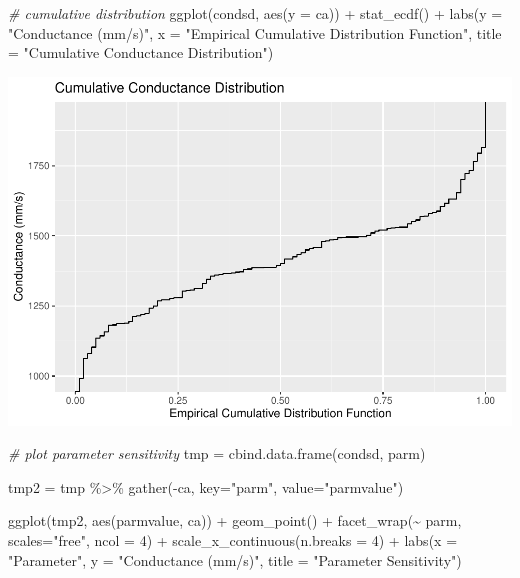 \documentclass[
]{article}
\newenvironment{Shaded}{\begin{snugshade}}{\end{snugshade}}
\newcommand{\AttributeTok}[1]{\textcolor[rgb]{0.77,0.63,0.00}{#1}}
\newcommand{\CommentTok}[1]{\textcolor[rgb]{0.56,0.35,0.01}{\textit{#1}}}
\newcommand{\DecValTok}[1]{\textcolor[rgb]{0.00,0.00,0.81}{#1}}
\newcommand{\FunctionTok}[1]{\textcolor[rgb]{0.00,0.00,0.00}{#1}}
\newcommand{\NormalTok}[1]{#1}
\newcommand{\OtherTok}[1]{\textcolor[rgb]{0.56,0.35,0.01}{#1}}
\newcommand{\SpecialCharTok}[1]{\textcolor[rgb]{0.00,0.00,0.00}{#1}}
\newcommand{\StringTok}[1]{\textcolor[rgb]{0.31,0.60,0.02}{#1}}
\begin{document}
\begin{Shaded}
\begin{Highlighting}[]
\CommentTok{\# cumulative distribution}
\FunctionTok{ggplot}\NormalTok{(condsd, }\FunctionTok{aes}\NormalTok{(}\AttributeTok{y =}\NormalTok{ ca)) }\SpecialCharTok{+}
  \FunctionTok{stat\_ecdf}\NormalTok{() }\SpecialCharTok{+}
  \FunctionTok{labs}\NormalTok{(}\AttributeTok{y =} \StringTok{"Conductance (mm/s)"}\NormalTok{,}
       \AttributeTok{x =} \StringTok{"Empirical Cumulative Distribution Function"}\NormalTok{,}
       \AttributeTok{title =} \StringTok{"Cumulative Conductance Distribution"}\NormalTok{)}
\end{Highlighting}
\end{Shaded}

\includegraphics{assignment_4_files/figure-latex/unnamed-chunk-4-2.pdf}

\begin{Shaded}
\begin{Highlighting}[]
\CommentTok{\# plot parameter sensitivity}
\NormalTok{tmp }\OtherTok{=} \FunctionTok{cbind.data.frame}\NormalTok{(condsd, parm)}

\NormalTok{tmp2 }\OtherTok{=}\NormalTok{ tmp }\SpecialCharTok{\%\textgreater{}\%} \FunctionTok{gather}\NormalTok{(}\SpecialCharTok{{-}}\NormalTok{ca, }\AttributeTok{key=}\StringTok{"parm"}\NormalTok{, }\AttributeTok{value=}\StringTok{"parmvalue"}\NormalTok{)}

\FunctionTok{ggplot}\NormalTok{(tmp2, }\FunctionTok{aes}\NormalTok{(parmvalue, ca)) }\SpecialCharTok{+}
  \FunctionTok{geom\_point}\NormalTok{() }\SpecialCharTok{+}
  \FunctionTok{facet\_wrap}\NormalTok{(}\SpecialCharTok{\textasciitilde{}}\NormalTok{ parm, }\AttributeTok{scales=}\StringTok{"free"}\NormalTok{, }\AttributeTok{ncol =} \DecValTok{4}\NormalTok{) }\SpecialCharTok{+}
  \FunctionTok{scale\_x\_continuous}\NormalTok{(}\AttributeTok{n.breaks =} \DecValTok{4}\NormalTok{) }\SpecialCharTok{+}
  \FunctionTok{labs}\NormalTok{(}\AttributeTok{x =} \StringTok{"Parameter"}\NormalTok{,}
       \AttributeTok{y =} \StringTok{"Conductance (mm/s)"}\NormalTok{,}
       \AttributeTok{title =} \StringTok{"Parameter Sensitivity"}\NormalTok{)}
\end{Highlighting}
\end{Shaded}
\end{document}
